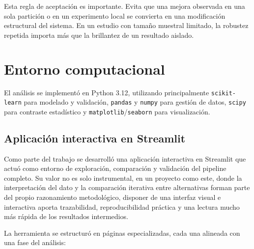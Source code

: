 Esta regla de aceptación es importante. Evita que una mejora observada en una sola partición o en un experimento local
se convierta en una modificación estructural del sistema. En un estudio con tamaño muestral limitado, la robustez
repetida importa más que la brillantez de un resultado aislado.

\section{Entorno computacional}

El análisis se implementó en Python 3.12, utilizando principalmente \texttt{scikit-learn} para modelado y validación,
\texttt{pandas} y \texttt{numpy} para gestión de datos, \texttt{scipy} para contraste estadístico y
\texttt{matplotlib}/\texttt{seaborn} para visualización.

\subsection{Aplicación interactiva en Streamlit}

Como parte del trabajo se desarrolló una aplicación interactiva en Streamlit que actuó como entorno de exploración,
comparación y validación del pipeline completo. Su valor no es solo instrumental, en un proyecto como este, donde la
interpretación del dato y la comparación iterativa entre alternativas forman parte del propio razonamiento metodológico,
disponer de una interfaz visual e interactiva aporta trazabilidad, reproducibilidad práctica y una lectura mucho más
rápida de los resultados intermedios.

La herramienta se estructuró en páginas especializadas, cada una alineada con una fase del análisis:

